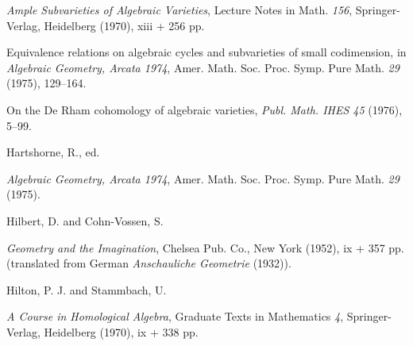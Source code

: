 {\noindent\hangindent=25bp\hspace*{6bp}%
\emph{Ample Subvarieties of Algebraic Varieties}, Lecture Notes in Math. \emph{156}, Springer-Verlag, Heidelberg (1970), xiii + 256 pp.\par
\noindent\hangindent=25bp\hspace*{6bp}%
Equivalence relations on algebraic cycles and subvarieties of small codimension, in \emph{Algebraic Geometry, Arcata 1974}, Amer. Math. Soc. Proc. Symp. Pure Math. \emph{29} (1975), 129--164.\par
\noindent\hangindent=25bp\hspace*{6bp}%
On the De Rham cohomology of algebraic varieties, \emph{Publ. Math. IHES 45} (1976), 5--99.\par
\par\vspace{2.15pt}\noindent \hypertarget{bib-477-9}{}Hartshorne, R., ed.\par
\noindent\hangindent=25bp\hspace*{6bp}%
\emph{Algebraic Geometry, Arcata 1974}, Amer. Math. Soc. Proc. Symp. Pure Math. \emph{29} (1975).\par
\par\vspace{2.15pt}\noindent \hypertarget{bib-477-10}{}Hilbert, D. and Cohn-Vossen, S.\par
\noindent\hangindent=25bp\hspace*{6bp}%
\emph{Geometry and the Imagination}, Chelsea Pub. Co., New York (1952), ix + 357 pp. (translated from German \emph{Anschauliche Geometrie} (1932)).\par
\par\vspace{2.15pt}\noindent \hypertarget{bib-477-11}{}Hilton, P. J. and Stammbach, U.\par
\noindent\hangindent=25bp\hspace*{6bp}%
\emph{A Course in Homological Algebra}, Graduate Texts in Mathematics \emph{4}, Springer-Verlag, Heidelberg (1970), ix + 338 pp.\par
}
